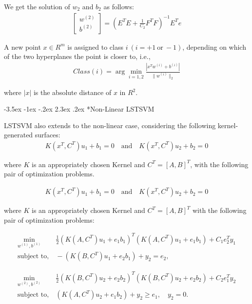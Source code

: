 \documentclass[12pt,a4paper,oneside,english]{report}
\makeatletter
\renewcommand\section{\@startsection {section}{1}{\z@}%
                                   {-3.5ex \@plus -1ex \@minus -.2ex}%
                                   {2.3ex \@plus.2ex}%
                                   {\centering\normalfont\LARGE\bfseries}}
\makeatother
\begin{document}
We get the solution of \( w_2 \) and \( b_2 \) as follows:
\begin{align}
\begin{bmatrix}
w^{(2)} \\
b^{(2)}
\end{bmatrix}
= \left( E^T E + \frac{1}{C_2} F^T F \right)^{-1} E^T e
\end{align}

A new point \( x \in R^m \) is assigned to class \( i \ (i = +1 \ \text{or} \ -1) \), depending on which of the two hyperplanes the point is closer to, i.e.,
\begin{align}
Class(i) = \arg\min_{i=1,2} \frac{|x^T w^{(i)} + b^{(i)}|}{\|w^{(i)}\|_2}
\end{align}

where \( |x| \) is the absolute distance of \( x \) in \( R^2 \).

\section*{Non-Linear LSTSVM}

LSTSVM also extends to the non-linear case, considering the following kernel-generated surfaces:
\begin{align}
K(x^T, C^T) u_1 + b_1 = 0 \quad \text{and} \quad K(x^T, C^T) u_2 + b_2 = 0 
\end{align}

where \( K \) is an appropriately chosen Kernel and \( C^T = [A, B]^T \), with the following pair of optimization problems.

\begin{align}
K(x^T, C^T) u_1 + b_1 = 0 \quad \text{and} \quad K(x^T, C^T) u_2 + b_2 = 0 
\end{align}

where \( K \) is an appropriately chosen Kernel and \( C^T = [A, B]^T \) with the following pair of optimization problems:

\begin{align} \label{ls1}
\min_{w^{(1)}, b^{(1)}} &\ \frac{1}{2} (K(A, C^T) u_1 + e_1 b_1)^T (K(A, C^T) u_1 + e_1 b_1) + C_1 e_2^T y_1 \nonumber \\
\text{subject to,} &\ - (K(B, C^T) u_1 + e_2 b_1) + y_2 = e_2,
\end{align}

\begin{align} \label{ls2}
\min_{w^{(2)}, b^{(2)}} &\ \frac{1}{2} \left( K(B, C^T) u_2 + e_2 b_2 \right)^T \left( K(B, C^T) u_2 + e_2 b_2 \right) + C_2 e_1^T y_2 \nonumber \\
\text{subject to,} &\ \left( K(A, C^T) u_2 + e_1 b_2 \right) + y_2 \geq e_1, \quad y_2 = 0.
\end{align}
\end{document}
